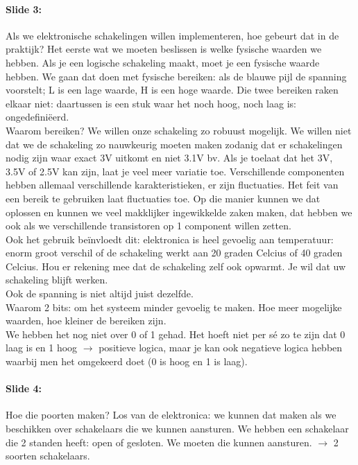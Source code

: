 \documentclass[10pt,a4paper]{book}
\begin{document}
\paragraph{Slide 3:} Als we elektronische schakelingen willen implementeren, hoe gebeurt dat in de praktijk? Het eerste wat we moeten beslissen is welke fysische waarden we hebben. Als je een logische schakeling maakt, moet je een fysische waarde hebben. We gaan dat doen met fysische bereiken: als de blauwe pijl de spanning voorstelt; L is een lage waarde, H is een hoge waarde. Die twee bereiken raken elkaar niet: daartussen is een stuk waar het noch hoog, noch laag is: ongedefini\"eerd.\\
Waarom bereiken? We willen onze schakeling zo robuust mogelijk. We willen niet dat we de schakeling zo nauwkeurig moeten maken zodanig dat er schakelingen nodig zijn waar exact 3V uitkomt en niet 3.1V bv. Als je toelaat dat het 3V, 3.5V of 2.5V kan zijn, laat je veel meer variatie toe. Verschillende componenten hebben allemaal verschillende karakteristieken, er zijn fluctuaties. Het feit van een bereik te gebruiken laat fluctuaties toe. Op die manier kunnen we dat oplossen en kunnen we veel makklijker ingewikkelde zaken maken, dat hebben we ook als we verschillende transistoren op 1 component willen zetten.\\
Ook het gebruik be\"invloedt dit: elektronica is heel gevoelig aan temperatuur: enorm groot verschil of de schakeling werkt aan 20 graden Celcius of 40 graden Celcius. Hou er rekening mee dat de schakeling zelf ook opwarmt. Je wil dat uw schakeling blijft werken. \\
Ook de spanning is niet altijd juist dezelfde.\\
Waarom 2 bits: om het systeem minder gevoelig te maken. Hoe meer mogelijke waarden, hoe kleiner de bereiken zijn.\\
We hebben het nog niet over 0 of 1 gehad. Het hoeft niet per s\'e zo te zijn dat 0 laag is en 1 hoog $\rightarrow$ positieve logica, maar je kan ook negatieve logica hebben waarbij men het omgekeerd doet (0 is hoog en 1 is laag).

\paragraph{Slide 4:} Hoe die poorten maken? Los van de elektronica: we kunnen dat maken als we beschikken over schakelaars die we kunnen aansturen. We hebben een schakelaar die 2 standen heeft: open of gesloten. We moeten die kunnen aansturen. $\rightarrow$ 2 soorten schakelaars.
\end{document}

